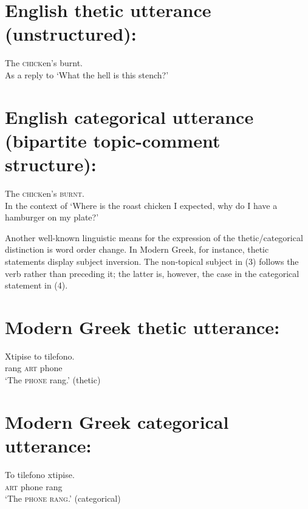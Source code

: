 \documentclass[output=paper]{langsci/langscibook}
\begin{document}
\chapter[ English thetic utterance (unstructured):]{ English thetic utterance (unstructured):}
\gll The \textsc{chick}en’s burnt. \\
\glt As a reply to ‘What the hell is this stench?’
\z

\chapter[ English categorical utterance (bipartite topic{}-comment structure):]{ English categorical utterance (bipartite topic-comment structure):}
\gll The \textsc{chick}en’s \textsc{burnt}. \\
\glt In the context of ‘Where is the roast chicken I expected, why do I have a hamburger on my plate?’ \citep[529]{Sasse1987}
\z

Another well-known linguistic means for the expression of the thetic/categorical distinction is word order change. In Modern Greek, for instance, thetic statements display subject inversion. The non-topical subject in (3) follows the verb rather than preceding it; the latter is, however, the case in the categorical statement in (4).

\chapter[ Modern Greek   thetic utterance:]{ Modern Greek   thetic utterance:}
\gll Xtipise    to    tilefono. \\
     rang    \textsc{art}    phone\\
\glt ‘The \textsc{phone} rang.’ (thetic)
\z

\chapter[ Modern Greek   categorical utterance:]{ Modern Greek   categorical utterance:}
\gll To     tilefono   xtipise.\\
     \textsc{art}    phone     rang\\
\glt ‘The \textsc{phone rang}.’ (categorical) \citep[536]{Sasse1987}
\z
\end{document}
